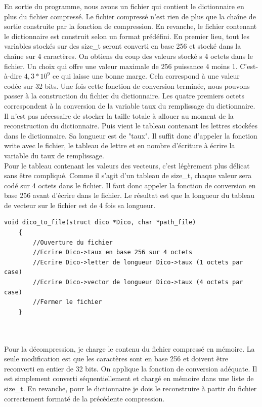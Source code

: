         En sortie du programme, nous avons un fichier qui contient le dictionnaire en plus du fichier compressé. Le fichier compressé n'est rien de plus que la chaîne de sortie construite par la fonction de compression. En revanche, le fichier contenant le dictionnaire est construit selon un format prédéfini. En premier lieu, tout les variables stockés sur des size\_t seront converti en base 256 et stocké dans la chaîne sur 4 caractères. On obtiens du coup des valeurs stocké s  4 octets dans le fichier. Un choix qui offre une valeur maximale de 256 puissance 4 moins 1. C'est-à-dire $4,3 * 10^{9}$ ce qui laisse une bonne marge. Cela correspond à une valeur codée sur 32 bits. Une fois cette fonction de conversion terminée, nous pouvons passer à la construction du fichier du dictionnaire.
        Les quatre premiers octets correspondent à la conversion de la variable taux du remplissage du dictionnaire. Il n'est pas nécessaire de stocker la taille totale à allouer au moment de la reconstruction du dictionnaire. Puis vient le tableau contenant les lettres stockées dans le dictionnaire. Sa longueur est de "taux". Il suffit donc d'appeler la fonction write avec le fichier, le tableau de lettre et en nombre d'écriture à écrire la variable du taux de remplissage.\\
        Pour le tableau contenant les valeurs des vecteurs, c'est légèrement plus délicat sans être compliqué. Comme il s'agit d'un tableau de size\_t, chaque valeur sera codé sur 4 octets dans le fichier. Il faut donc appeler la fonction de conversion en base 256 avant d'écrire dans le fichier. Le résultat est que la longueur du tableau de vecteur sur le fichier est de 4 fois sa longueur.\\
        \begin{lstlisting}[style=CStyle]
    void dico_to_file(struct dico *Dico, char *path_file)
    {
        //Ouverture du fichier
        //Ecrire Dico->taux en base 256 sur 4 octets
        //Ecrire Dico->letter de longueur Dico->taux (1 octets par case)
        //Ecrire Dico->vector de longueur Dico->taux (4 octets par case)
        //Fermer le fichier
    }
		\end{lstlisting}
		\\\\
		Pour la décompression, je charge le contenu du fichier compressé en mémoire. La seule modification est que les caractères sont en base 256 et doivent être reconverti en entier de 32 bits. On applique la fonction de conversion adéquate. Il est simplement converti séquentiellement et chargé en mémoire dans une liste de size\_t. En revanche, pour le dictionnaire je dois le reconstruire à partir du fichier correctement formaté de la précédente compression.\\
